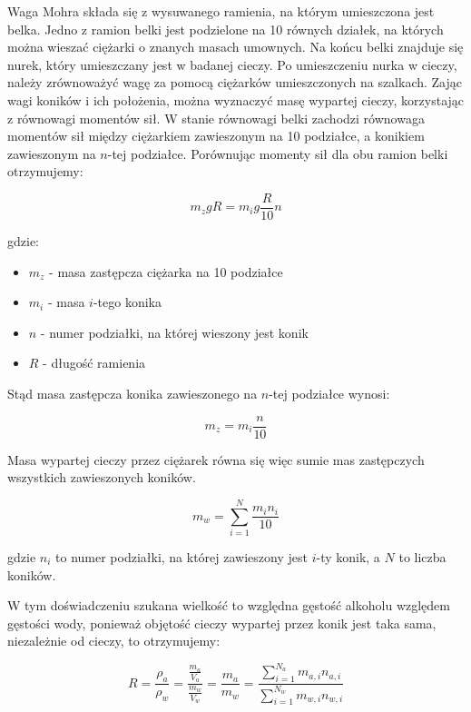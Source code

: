 \documentclass[a4paper,12pt]{article}
\begin{document}
Waga Mohra składa się z wysuwanego ramienia, na którym umieszczona jest belka. Jedno z ramion belki jest podzielone na 10 równych działek, na których można wieszać ciężarki o znanych masach umownych. Na końcu belki znajduje się nurek, który umieszczany jest w badanej cieczy. Po umieszczeniu nurka w cieczy, należy zrównoważyć wagę za pomocą ciężarków umieszczonych na szalkach. Zając wagi koników i ich położenia, można wyznaczyć masę wypartej cieczy, korzystając z równowagi momentów sił.
W stanie równowagi belki zachodzi równowaga momentów sił między ciężarkiem zawieszonym na 10 podziałce, a konikiem zawieszonym na $n$-tej podziałce. Porównując momenty sił dla obu ramion belki otrzymujemy:

\begin{equation*}
    m_z gR = m_i g \frac{R}{10} n
\end{equation*}

gdzie:
\begin{itemize}
    \item $m_z$ - masa zastępcza ciężarka na 10 podziałce
    \item $m_i$ - masa $i$-tego konika
    \item $n$ - numer podziałki, na której wieszony jest konik
    \item $R$ - długość ramienia
\end{itemize}

Stąd masa zastępcza konika zawieszonego na $n$-tej podziałce wynosi:

\begin{equation*}
    m_z = m_i \frac{n}{10}
\end{equation*}

Masa wypartej cieczy przez ciężarek równa się więc sumie mas zastępczych wszystkich zawieszonych koników.

\begin{equation}
    \label{eq:waga_mohra}
    m_w = \sum_{i=1}^{N} \frac{m_i n_i}{10}
\end{equation}

gdzie $n_i$ to numer podziałki, na której zawieszony jest $i$-ty konik, a $N$ to liczba koników.


W tym doświadczeniu szukana wielkość to względna gęstość alkoholu względem gęstości wody, ponieważ objętość cieczy wypartej przez konik jest taka sama, niezależnie od cieczy, to otrzymujemy:

\begin{equation}
    \label{eq:wzgledna_gestosc}
    R = \frac{\rho_a}{\rho_w} = \frac{\frac{m_a}{V_a}}{\frac{m_w}{V_w}} = \frac{m_a}{m_w} = \frac{\sum_{i=1}^{N_a} m_{a,i} n_{a,i}}{\sum_{i=1}^{N_w} m_{w,i} n_{w,i}}
\end{equation}
\end{document}
